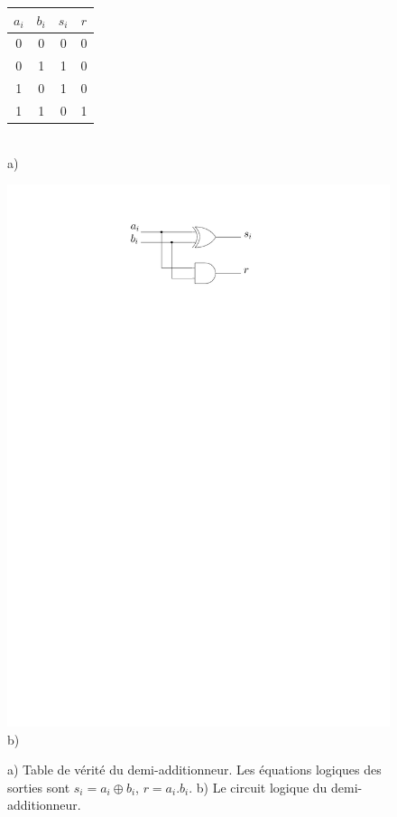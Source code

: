 \begin{figure}[htbp]
   \begin{minipage}[c]{.46\linewidth}
\begin{tabular}{cc|cc}
$a_i$ & $b_i$ & $s_i$ & $r$\\
\hline
0 & 0 & 0 & 0\\
0 & 1 & 1 & 0\\
1 & 0 & 1 & 0\\
1 & 1 & 0 & 1
\end{tabular}\\\centering a)
   \end{minipage} \hfill
   \begin{minipage}[c]{.46\linewidth}
\includegraphics[width=\columnwidth]{Figs/half_adder.pdf}\\\centering b)
   \end{minipage}
\caption{\label{fig:demi_additionneur} a) Table de vérité du demi-additionneur. Les équations logiques des sorties sont $s_i = a_i \oplus b_i$, $r = a_i . b_i$. b) Le circuit logique du demi-additionneur.}
\end{figure}


